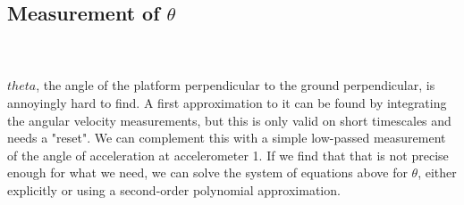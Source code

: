\documentclass[11pt]{amsart}
\begin{document}
\subsection{Measurement of $\theta$}
\ \\ \ \\
$theta$, the angle of the platform perpendicular to the ground perpendicular, is annoyingly hard to find. A first approximation to it can be found by integrating the angular velocity measurements, but this is only valid on short timescales and needs a "reset". We can complement this with a simple low-passed measurement of the angle of acceleration at accelerometer 1. If we find that that is not precise enough for what we need, we can solve the system of equations above for $\theta$, either explicitly or using a second-order polynomial approximation. 
\end{document}
